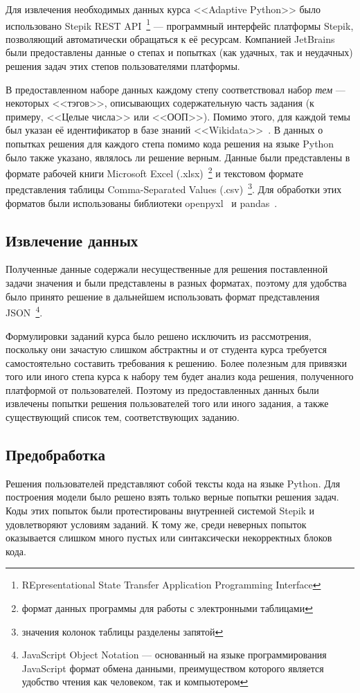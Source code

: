 \documentclass[14pt]{matmex-diploma-custom}
\begin{document}
Для извлечения необходимых данных курса <<Adaptive Python>> было использовано Stepik REST API~\footnote{REpresentational State Transfer Application Programming Interface} --- программный интерфейс платформы Stepik, позволяющий автоматически обращаться к её ресурсам. Компанией JetBrains были предоставлены данные о степах и попытках (как удачных, так и неудачных) решения задач этих степов пользователями платформы.

В предоставленном наборе данных каждому степу соответствовал набор \textit{тем} --- некоторых <<тэгов>>, описывающих содержательную часть задания (к примеру,  <<Целые числа>> или <<ООП>>). Помимо этого, для каждой темы был указан её идентификатор в базе знаний <<Wikidata>>~\cite{wikidata}. В данных о попытках решения для каждого степа помимо кода решения на языке Python было также указано, являлось ли решение верным. Данные были представлены в формате рабочей книги Microsoft Excel (.xlsx)~\footnote{формат данных программы для работы с электронными таблицами} и текстовом формате представления таблицы Comma-Separated Values (.csv)~\footnote{значения колонок таблицы разделены запятой}. Для обработки этих форматов были использованы библиотеки openpyxl~\cite{openpyxl} и pandas~\cite{pandas}.

\subsection{Извлечение данных}
Полученные данные содержали несущественные для решения поставленной задачи значения и были представлены в разных форматах, поэтому для удобства было принято решение в дальнейшем использовать формат представления JSON~\footnote{JavaScript Object Notation --- основанный на языке программирования JavaScript формат обмена данными, преимуществом которого является удобство чтения как человеком, так и компьютером}.

Формулировки заданий курса было решено исключить из рассмотрения, поскольку они зачастую слишком абстрактны и от студента курса требуется самостоятельно составить требования к решению. Более полезным для привязки того или иного степа курса к набору тем будет анализ кода решения, полученного платформой от пользователей. Поэтому из предоставленных данных были извлечены попытки решения пользователей того или иного задания, а также существующий список тем, соответствующих заданию.

\subsection{Предобработка}
Решения пользователей представляют собой тексты кода на языке Python. Для построения модели было решено взять только верные попытки решения задач. Коды этих попыток были протестированы внутренней системой Stepik и удовлетворяют условиям заданий. К тому же, среди неверных попыток оказывается слишком много пустых или синтаксически некорректных блоков кода.
\end{document}
